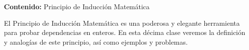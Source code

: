 {\Large
    \textbf{Contenido:} Principio de Inducción Matemática
}

El Principio de Inducción Matemática es una poderosa y elegante herramienta para probar dependencias en enteros.
En esta décima clase veremos la definición y analogías de este principio, así como ejemplos y problemas.